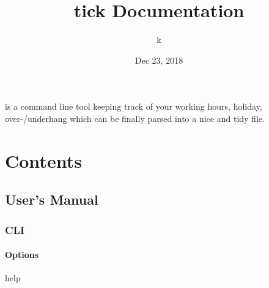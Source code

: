 \documentclass[letterpaper,10pt,english]{sphinxmanual}
\title{tick Documentation}
\date{Dec 23, 2018}
\author{k}
\begin{document}
\pagestyle{empty}
\maketitle
\pagestyle{plain}
\sphinxtableofcontents
\pagestyle{normal}
\label{\detokenize{index::doc}}


 is a command line tool keeping track of your working hours, holiday, over-/underhang which can be finally parsed into a nice and tidy  file.


\chapter{Contents}
\label{\detokenize{index:contents}}

\section{User’s Manual}
\label{\detokenize{usermanual:users-manual}}\label{\detokenize{usermanual::doc}}

\subsection{CLI}
\label{\detokenize{usermanual:cli}}

\subsubsection{Options}
\label{\detokenize{usermanual:options}}

\begin{fulllineitems}
\label{\detokenize{usermanual:cmdoption-h}}
\end{fulllineitems}


help

\begin{fulllineitems}
\label{\detokenize{usermanual:cmdoption-y}}
\end{fulllineitems}
\end{document}
